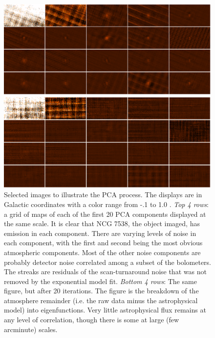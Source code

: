 
\begin{figure}
  \begin{minipage}{6.5in}
    \begin{center}
      \includegraphics[angle=270,scale=0.6]{eachpca}
    \end{center}
  \end{minipage}
\vspace{0.25in}
  \begin{minipage}{6.5in}
    \begin{center}
      \includegraphics[angle=270,scale=0.6]{eachpca_20iters}
    \end{center}
  \end{minipage}
  \caption{Selected images to illustrate the PCA process.  The
  displays are in Galactic coordinates with a color range from -.1 to
  1.0 \jyb.  {\it Top 4 rows}: a grid of maps of each of the first 20
  PCA components displayed at the same scale.  It is clear that NCG
  7538, the object imaged, has emission in each component.  There are
  varying levels of noise in each component, with the first and second
  being the most obvious atmospheric components.  Most of the other
  noise components are probably detector noise correlated among a
  subset of the bolometers.  The streaks are residuals of the
  scan-turnaround noise that was not removed by the exponential model
  fit.  {\it Bottom 4 rows}: The same figure, but after 20 iterations.
  The figure is the breakdown of the atmosphere remainder (i.e.  the
  raw data minus the astrophysical model) into eigenfunctions.  Very
  little astrophysical flux remains at any level of correlation,
  though there is some at large (few arcminute) scales.}
\label{fig:PCA_Graphical}

\end{figure}

